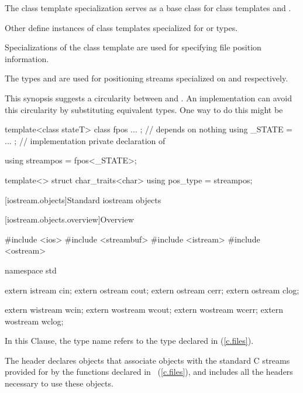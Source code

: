 \pnum
The
class template specialization
serves as a base class for class templates
and
.

\pnum
Other  define instances of
class templates
specialized for
or
types.

\pnum
Specializations of the class template
are
used for specifying file position information.

\pnum
The types
and
are used for positioning streams specialized on
and
respectively.

\pnum
This synopsis suggests a circularity between
and
.
An implementation can avoid this circularity by substituting equivalent
types.
One way to do this might be
\begin{codeblock}
template<class stateT> class fpos { ... };      // depends on nothing
using _STATE = ... ;             // implementation private declaration of 

using streampos = fpos<_STATE>;

template<> struct char_traits<char> {
  using pos_type = streampos;
}
\end{codeblock}
\exitnote

[iostream.objects]{Standard iostream objects}

[iostream.objects.overview]{Overview}

%

\begin{codeblock}
#include <ios>
#include <streambuf>
#include <istream>
#include <ostream>

namespace std {
  extern istream cin;
  extern ostream cout;
  extern ostream cerr;
  extern ostream clog;

  extern wistream wcin;
  extern wostream wcout;
  extern wostream wcerr;
  extern wostream wclog;
}
\end{codeblock}

\pnum
In this Clause, the type name  refers to
the type
declared in
%
(\ref{c.files}).

\pnum
The header
declares objects that associate objects with the
standard C streams provided for by the functions declared in
~(\ref{c.files}), and includes all the headers necessary to use
these objects.
%

